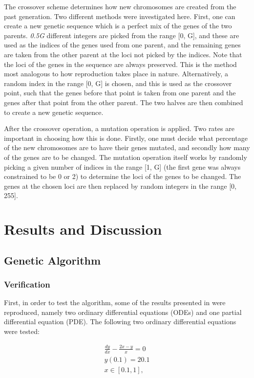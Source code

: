 \documentclass[multicolumn, 12pt]{extarticle}
\begin{document}
The crossover scheme determines how new chromosomes are created from the past generation. Two different methods were investigated here. First, one can create a new genetic sequence which is a perfect mix of the genes of the two parents. \textit{0.5G} different integers are picked from the range [0, G], and these are used as the indices of the genes used from one parent, and the remaining genes are taken from the other parent at the loci not picked by the indices. Note that the loci of the genes in the sequence are always preserved. This is the method most analogous to how reproduction takes place in nature. Alternatively, a random index in the range [0, G] is chosen, and this is used as the crossover point, such that the genes before that point is taken from one parent and the genes after that point from the other parent. The two halves are then combined to create a new genetic sequence.

After the crossover operation, a mutation operation is applied. Two rates are important in choosing how this is done. Firstly, one must decide what percentage of the new chromosomes are to have their genes mutated, and secondly how many of the genes are to be changed. The mutation operation itself works by randomly picking a given number of indices in the range [1, G] (the first gene was always constrained to be 0 or 2) to determine the loci of the genes to be changed. The genes at the chosen loci are then replaced by random integers in the range [0, 255].

\section{Results and Discussion}

\subsection{Genetic Algorithm}
\subsubsection{Verification}
First, in order to test the algorithm, some of the results presented in \cite{Lagaris} were reproduced, namely two ordinary differential equations (ODEs) and one partial differential equation (PDE). The following two ordinary differential equations were tested:

\begin{align*}
	\frac{dy}{dx}  - \frac{2x - y}{x} = 0 \\
	y(0.1) = 20.1    \\
	x \in [0.1, 1],
\end{align*}
\end{document}
